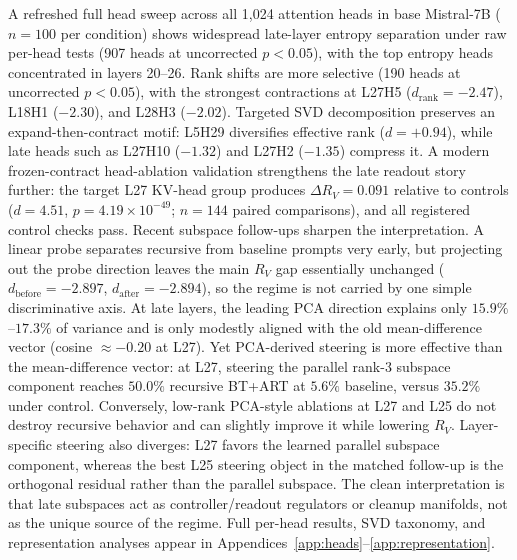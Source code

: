 \documentclass{article}
\newcommand{\RV}{R_V}
\newcommand{\dcohen}{d}
\begin{document}
A refreshed full head sweep across all 1{,}024 attention heads in base Mistral-7B
($n = 100$ per condition) shows widespread late-layer entropy separation under raw per-head tests
(907 heads at uncorrected $p < 0.05$), with the top entropy heads concentrated in layers 20--26.
Rank shifts are more selective (190 heads at uncorrected $p < 0.05$), with the strongest
contractions at L27H5 ($\dcohen_\mathrm{rank} = -2.47$), L18H1 ($-2.30$), and L28H3 ($-2.02$).
Targeted SVD decomposition preserves an expand-then-contract motif:
L5H29 diversifies effective rank ($\dcohen = +0.94$), while late heads such as
L27H10 ($-1.32$) and L27H2 ($-1.35$) compress it.
A modern frozen-contract head-ablation validation strengthens the late readout story further:
the target L27 KV-head group produces $\Delta \RV = 0.091$ relative to controls
($\dcohen = 4.51$, $p = 4.19 \times 10^{-49}$; $n = 144$ paired comparisons), and all registered
control checks pass.
Recent subspace follow-ups sharpen the interpretation.
A linear probe separates recursive from baseline prompts very early, but projecting out the probe
direction leaves the main $\RV$ gap essentially unchanged
($d_\mathrm{before} = -2.897$, $d_\mathrm{after} = -2.894$), so the regime is not carried by one
simple discriminative axis.
At late layers, the leading PCA direction explains only $15.9\%$--$17.3\%$ of variance and is only
modestly aligned with the old mean-difference vector (cosine $\approx -0.20$ at L27).
Yet PCA-derived steering is more effective than the mean-difference vector:
at L27, steering the parallel rank-3 subspace component reaches $50.0\%$ recursive BT+ART at
$5.6\%$ baseline, versus $35.2\%$ under control.
Conversely, low-rank PCA-style ablations at L27 and L25 do not destroy recursive behavior and can
slightly improve it while lowering $\RV$.
Layer-specific steering also diverges:
L27 favors the learned parallel subspace component, whereas the best L25 steering object in the
matched follow-up is the orthogonal residual rather than the parallel subspace.
The clean interpretation is that late subspaces act as controller/readout regulators or cleanup
manifolds, not as the unique source of the regime.
Full per-head results, SVD taxonomy, and representation analyses appear in
Appendices~\ref{app:heads}--\ref{app:representation}.


\end{document}
